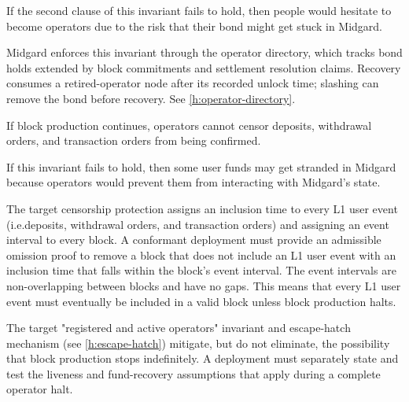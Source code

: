 \documentclass[../midgard.tex]{subfiles}
\begin{document}
\begin{description}
    If the second clause of this invariant fails to hold, then people would hesitate to become operators due to the risk that their bond might get stuck in Midgard.

    Midgard enforces this invariant through the operator directory, which tracks bond holds extended by block commitments and settlement resolution claims. Recovery consumes a retired-operator node after its recorded unlock time; slashing can remove the bond before recovery.
    See \cref{h:operator-directory}.

  \item[Censorship protection.] If block production continues, operators cannot censor deposits, withdrawal orders, and transaction orders from being confirmed.

    If this invariant fails to hold, then some user funds may get stranded in Midgard because operators would prevent them from interacting with Midgard's state.

    The target censorship protection assigns an inclusion time to every L1 user event (i.e.deposits, withdrawal orders, and transaction orders) and assigning an event interval to every block.
    A conformant deployment must provide an admissible omission proof to remove a block that does not include an L1 user event with an inclusion time that falls within the block's event interval.
    The event intervals are non-overlapping between blocks and have no gaps.
    This means that every L1 user event must eventually be included in a valid block unless block production halts.

    The target "registered and active operators" invariant and escape-hatch mechanism (see \cref{h:escape-hatch}) mitigate, but do not eliminate, the possibility that block production stops indefinitely.
    A deployment must separately state and test the liveness and fund-recovery assumptions that apply during a complete operator halt.
\end{description}
\end{document}
